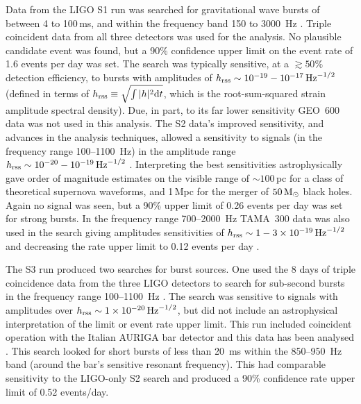 \documentclass{article}
\begin{document}
Data from the LIGO S1 run was searched for gravitational wave bursts of between
4 to 100\,ms, and within the frequency band 150 to 3000~Hz \cite{Abbott:2004b}.
Triple coincident data from all three detectors was used for the analysis. No
plausible candidate event was found, but a 90\% confidence upper limit on the
event rate of 1.6 events per day was set. The search was typically
sensitive, at a $\gtrsim50\%$ detection efficiency, to bursts with amplitudes of
$h_{\rm rss}\sim10^{-19}-10^{-17}\,{\rm Hz}^{-1/2}$ (defined in terms of $h_{\rm
rss} \equiv \sqrt{\int|h|^2{\rm d}t}$, which is the root-sum-squared strain amplitude
spectral density). Due, in part, to its far lower sensitivity GEO~600 data was
not used in this analysis. The S2 data's improved sensitivity, and advances in
the analysis techniques, allowed a sensitivity to signals (in the frequency
range 100--1100~Hz) in the amplitude range $h_{\rm
rss}\sim10^{-20}-10^{-19}\,{\rm Hz}^{-1/2}$ \cite{Abbott:2005a}. Interpreting
the best sensitivities astrophysically gave order of magnitude estimates on
the visible range of $\sim100$\,pc for a class of theoretical supernova
waveforms, and 1\,Mpc for the merger of $50\,{\rm M}_{\odot}$ black holes. Again
no signal was seen, but a 90\% upper limit of 0.26 events per day was set for
strong bursts. In the frequency range 700--2000~Hz TAMA~300 data was also used
in the search giving amplitudes sensitivities of $h_{\rm
rss}\sim1-3\times10^{-19}\,{\rm Hz}^{-1/2}$ and decreasing the rate upper limit
to 0.12 events per day \cite{Abbott:2005c}.

The S3 run produced two searches for burst sources. One used the 8 days of
triple coincidence data from the three LIGO detectors to search for sub-second
bursts in the frequency range 100--1100~Hz \cite{Abbott:2006a}. The search was
sensitive to signals with amplitudes over $h_{\rm rss}\sim1\times10^{-20}\,{\rm
Hz}^{-1/2}$, but did not include an astrophysical interpretation of the limit or
event rate upper limit. This run included coincident operation with the Italian
AURIGA bar detector and this data has been analysed \cite{Baggio:2008}. This
search looked for short bursts of less than 20~ms within the 850--950~Hz band
(around the bar's sensitive resonant frequency). This had comparable sensitivity
to the LIGO-only S2 search and produced a 90\% confidence rate upper limit of
0.52 events/day.
\end{document}
